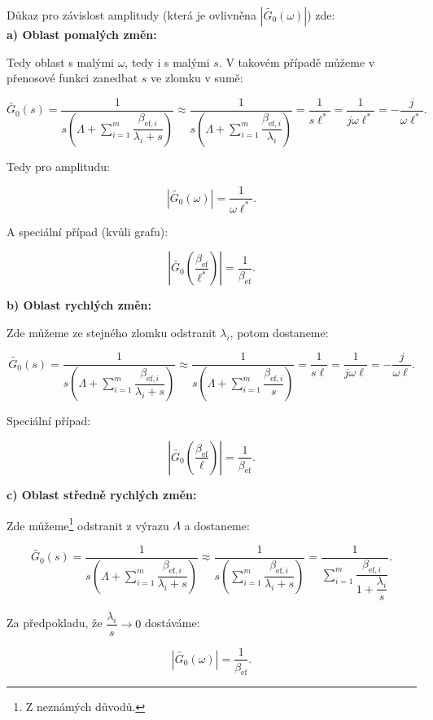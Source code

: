 Důkaz pro závislost amplitudy (která je ovlivněna $|\tilde{G_0}(\omega)|$) zde:\\

\textbf{a) Oblast pomalých změn:}

Tedy oblast s malými $\omega$, tedy i s malými $s$. V takovém případě můžeme v přenosové funkci zanedbat $s$ ve zlomku v sumě:

$$ \tilde{G_0}(s) = \dfrac{1}{s \left ( \Lambda + \sum_{i=1}^m \dfrac{\beta_{\text{ef},i}}{\lambda_i + s} \right )} \approx \dfrac{1}{s \left ( \Lambda + \sum_{i=1}^m \dfrac{\beta_{\text{ef},i}}{\lambda_i} \right )} = \dfrac{1}{s \ell^*} = \dfrac{1}{j \omega \ell^*} = - \dfrac{j}{\omega \ell^*}. $$

Tedy pro amplitudu:

$$ |\tilde{G_0}(\omega)| = \dfrac{1}{\omega \ell^*}. $$

A speciální případ (kvůli grafu):

$$ \left |\tilde{G_0} \left ( \dfrac{\beta_{\text{ef}}}{\ell^*} \right ) \right | = \dfrac{1}{\beta_{\text{ef}}}. $$

\textbf{b) Oblast rychlých změn:}

Zde můžeme ze stejného zlomku odstranit $\lambda_i$, potom dostaneme:

$$ \tilde{G_0}(s) = \dfrac{1}{s \left ( \Lambda + \sum_{i=1}^m \dfrac{\beta_{\text{ef},i}}{\lambda_i + s} \right )} \approx \dfrac{1}{s \left ( \Lambda + \sum_{i=1}^m \dfrac{\beta_{\text{ef},i}}{s} \right )} = \dfrac{1}{s \ell} = \dfrac{1}{j \omega \ell} = - \dfrac{j}{\omega \ell}. $$

Speciální případ:

$$ \left |\tilde{G_0} \left ( \dfrac{\beta_{\text{ef}}}{\ell} \right ) \right | = \dfrac{1}{\beta_{\text{ef}}}. $$

\textbf{c) Oblast středně rychlých změn:}

Zde můžeme\footnote{Z neznámých důvodů.} odstranit z výrazu $\Lambda$ a dostaneme:

$$ \tilde{G_0}(s) = \dfrac{1}{s \left ( \Lambda + \sum_{i=1}^m \dfrac{\beta_{\text{ef},i}}{\lambda_i + s} \right )} \approx \dfrac{1}{s \left ( \sum_{i=1}^m \dfrac{\beta_{\text{ef},i}}{\lambda_i + s} \right )} = \dfrac{1}{\sum_{i=1}^m \dfrac{\beta_{\text{ef},i}}{1 + \dfrac{\lambda_i}{s}} }. $$

Za předpokladu, že $\dfrac{\lambda_i}{s} \rightarrow 0$ dostáváme:

$$ \left |\tilde{G_0} \left (\omega \right ) \right | = \dfrac{1}{\beta_{\text{ef}}}. $$

